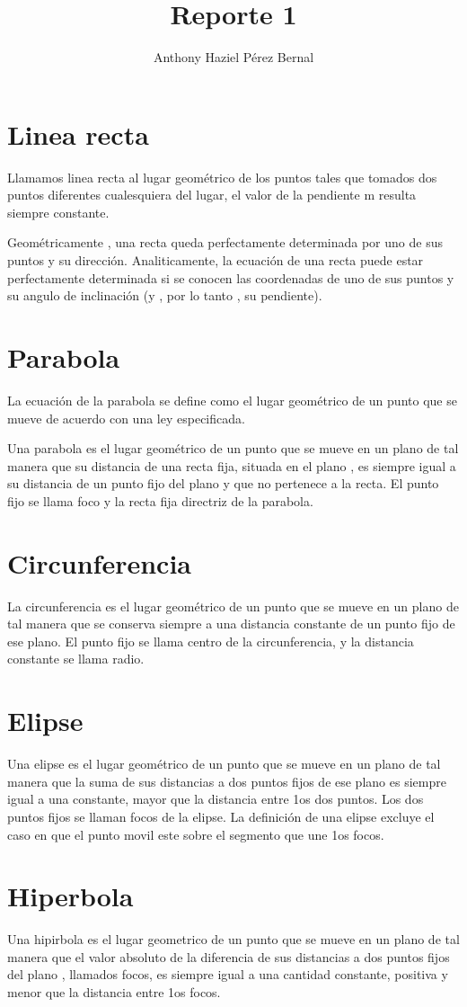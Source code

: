 \documentclass{article}
\title{Reporte 1}
\author{Anthony Haziel Pérez Bernal}
\begin{document}
\section{Linea recta}
Llamamos linea recta al lugar geométrico de los puntos tales que tomados dos puntos diferentes cualesquiera del lugar, el valor de la pendiente m resulta siempre constante.

Geométricamente , una recta queda perfectamente
determinada por uno de sus puntos y su dirección. Analiticamente, la ecuación de una recta puede estar perfectamente determinada si se
conocen las coordenadas de uno de sus puntos y su angulo de inclinación (y , por lo tanto , su pendiente).

\section{Parabola}
La ecuación de la parabola se define como el lugar geométrico de un punto que se mueve de acuerdo con una ley especificada.

Una parabola es el lugar geométrico de un punto que se mueve en un plano de tal manera que su distancia de una recta fija, situada en el plano , es siempre igual a su distancia de un punto fijo del plano y que no pertenece a la recta.
El punto fijo se llama foco y la recta fija directriz de la parabola.

\section{Circunferencia} 
La circunferencia es el lugar geométrico de un punto que se mueve en un plano de tal manera que se conserva siempre a una distancia constante de un punto fijo de ese plano. El punto fijo se llama centro de la circunferencia, y la distancia
constante se llama radio.

\section{Elipse}
Una elipse es el lugar geométrico de un punto que se mueve en un plano de tal manera que la suma de sus distancias a dos puntos fijos de ese plano es siempre igual a una constante, mayor que la distancia entre 1os dos puntos. Los dos puntos fijos se llaman focos de la elipse. La definición de
una elipse excluye el caso en que el punto movil este sobre el segmento que une 1os focos.

\section{Hiperbola}
Una hipirbola es el lugar geometrico de un punto que se mueve en un plano de tal manera que el valor absoluto de la diferencia de sus distancias a dos puntos fijos del plano , llamados focos, es siempre igual a una cantidad constante, positiva y menor que la distancia entre 1os focos. 



\end{document}
